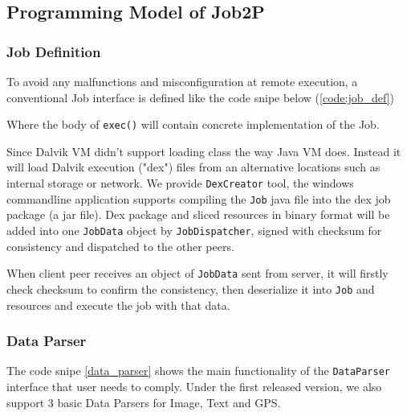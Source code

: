 \documentclass[conference]{IEEEtran}
\begin{document}
\subsection{Programming Model of Job2P} 

\subsubsection{Job Definition}\label{job-description}

To avoid any malfunctions and misconfiguration at remote execution, a conventional Job interface is defined like the code snipe below (\ref{code:job_def}) \\

\noindent {}	

Where the body of \texttt{exec()} will contain concrete implementation of the Job.

Since Dalvik VM didn't support loading class the way Java VM does. Instead it will load Dalvik execution ("dex") files from an alternative locations such as internal storage or network. We provide \texttt{DexCreator} tool, the windows commandline application supports compiling the \texttt{Job} java file into the dex job package (a jar file). Dex package and sliced resources in binary format will be added into one \texttt{JobData} object by \texttt{JobDispatcher}, signed with checksum for consistency and dispatched to the other peers.

When client peer receives an object of \texttt{JobData} sent from server, it will firstly check checksum to confirm the consistency, then deserialize it into \texttt{Job} and resources and execute the job with that data.

\subsubsection{Data Parser}
The code snipe \ref{data_parser} shows the main functionality of the \texttt{DataParser} interface that user needs to comply. Under the first released version, we also support 3 basic Data Parsers for Image, Text and GPS.\\
\end{document}
